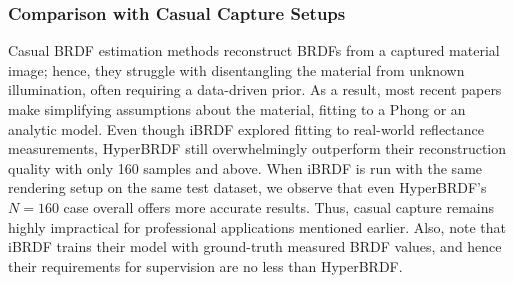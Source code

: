 \begin{table}[ht]
    \centering
    \caption{Hypernetwork - Average metric results across varying sample sizes ($N$) over the test set (Sparse and full reconstruction of unseen materials).}

    \label{table: ours_large_samples}
\end{table}


\subsubsection{Comparison with Casual Capture Setups}
Casual BRDF estimation methods reconstruct BRDFs from a captured material image; hence, they struggle with disentangling the material from unknown illumination, often requiring a data-driven prior. As a result, most recent papers make simplifying assumptions about the material, fitting to a Phong or an analytic model. Even though iBRDF \cite{chen2021invertible} explored fitting to real-world reflectance measurements, HyperBRDF still overwhelmingly outperform their reconstruction quality with only 160 samples and above. When iBRDF is run with the same rendering setup on the same test dataset, we observe that even HyperBRDF's $N=160$ case overall offers more accurate results. Thus, casual capture remains highly impractical for professional applications mentioned earlier. Also, note that iBRDF trains their model with ground-truth measured BRDF values, and hence their requirements for supervision are no less than HyperBRDF. 


